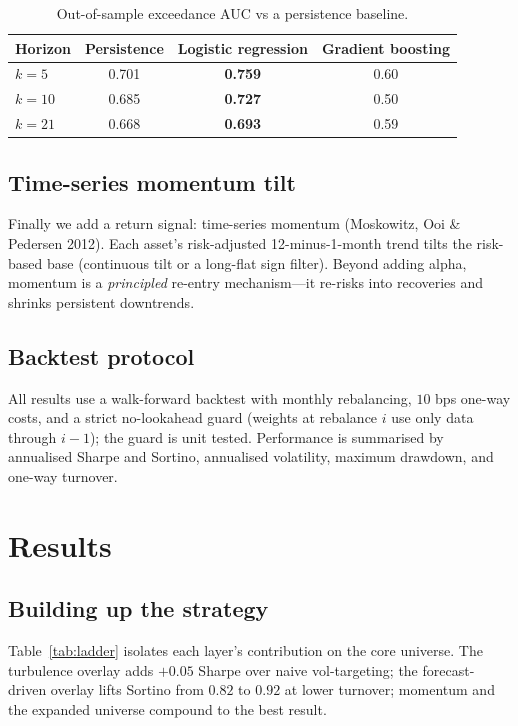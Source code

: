 \documentclass[11pt]{article}
\begin{document}
\begin{table}[h]\centering
\caption{Out-of-sample exceedance AUC vs a persistence baseline.}\label{tab:auc}
\begin{tabular}{lccc}
\toprule
Horizon & Persistence & Logistic regression & Gradient boosting \\
\midrule
$k=5$  & 0.701 & \textbf{0.759} & 0.60 \\
$k=10$ & 0.685 & \textbf{0.727} & 0.50 \\
$k=21$ & 0.668 & \textbf{0.693} & 0.59 \\
\bottomrule
\end{tabular}
\end{table}

\subsection{Time-series momentum tilt}
Finally we add a return signal: time-series momentum (Moskowitz, Ooi \& Pedersen 2012). Each asset's
risk-adjusted 12-minus-1-month trend tilts the risk-based base (continuous tilt or a long-flat sign
filter). Beyond adding alpha, momentum is a \emph{principled} re-entry mechanism---it re-risks into
recoveries and shrinks persistent downtrends.

\subsection{Backtest protocol}
All results use a walk-forward backtest with monthly rebalancing, $10$ bps one-way costs, and a
strict no-lookahead guard (weights at rebalance $i$ use only data through $i{-}1$); the guard is unit
tested. Performance is summarised by annualised Sharpe and Sortino, annualised volatility, maximum
drawdown, and one-way turnover.

\section{Results}
\subsection{Building up the strategy}
Table~\ref{tab:ladder} isolates each layer's contribution on the core universe. The turbulence
overlay adds $+0.05$ Sharpe over naive vol-targeting; the forecast-driven overlay lifts Sortino from
$0.82$ to $0.92$ at lower turnover; momentum and the expanded universe compound to the best result.
\end{document}

